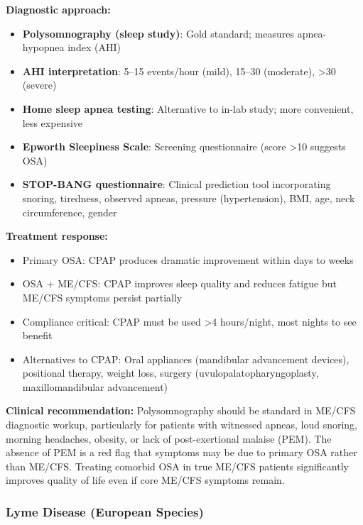 \begin{observation}
\textbf{Diagnostic approach:}
\begin{itemize}
    \item \textbf{Polysomnography (sleep study)}: Gold standard; measures apnea-hypopnea index (AHI)
    \item \textbf{AHI interpretation}: 5--15 events/hour (mild), 15--30 (moderate), >30 (severe)
    \item \textbf{Home sleep apnea testing}: Alternative to in-lab study; more convenient, less expensive
    \item \textbf{Epworth Sleepiness Scale}: Screening questionnaire (score >10 suggests OSA)
    \item \textbf{STOP-BANG questionnaire}: Clinical prediction tool incorporating snoring, tiredness, observed apneas, pressure (hypertension), BMI, age, neck circumference, gender
\end{itemize}

\textbf{Treatment response:}
\begin{itemize}
    \item Primary OSA: CPAP produces dramatic improvement within days to weeks
    \item OSA + ME/CFS: CPAP improves sleep quality and reduces fatigue but ME/CFS symptoms persist partially
    \item Compliance critical: CPAP must be used >4 hours/night, most nights to see benefit
    \item Alternatives to CPAP: Oral appliances (mandibular advancement devices), positional therapy, weight loss, surgery (uvulopalatopharyngoplasty, maxillomandibular advancement)
\end{itemize}

\textbf{Clinical recommendation:} Polysomnography should be standard in ME/CFS diagnostic workup, particularly for patients with witnessed apneas, loud snoring, morning headaches, obesity, or lack of post-exertional malaise (PEM). The absence of PEM is a red flag that symptoms may be due to primary OSA rather than ME/CFS. Treating comorbid OSA in true ME/CFS patients significantly improves quality of life even if core ME/CFS symptoms remain.
\end{observation}

\subsubsection{Lyme Disease (European Species)}

